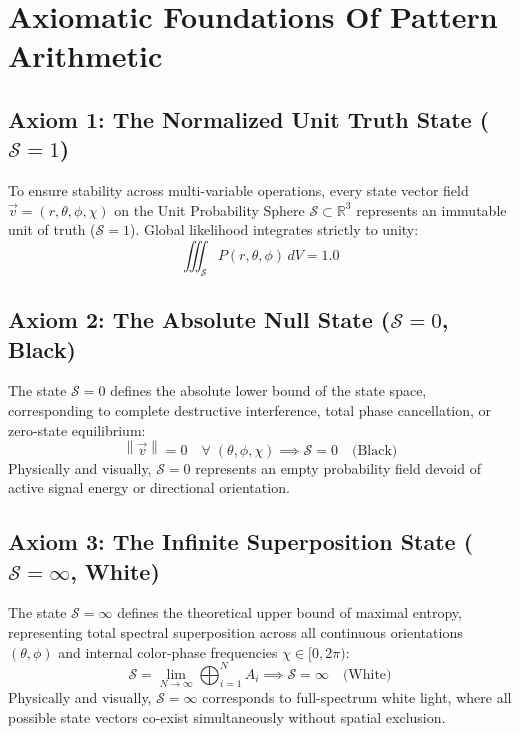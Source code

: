 \documentclass[12pt, a4paper]{article}
\providecommand{\norm}[1]{\left\lVert#1\right\rVert}
\begin{document}
\section{Axiomatic Foundations Of Pattern Arithmetic}

\subsection{Axiom 1: The Normalized Unit Truth State ($\mathcal{S} = 1$)}
\label{subsec:axiom1}
To ensure stability across multi-variable operations, every state vector field $\vec{v} = (r, \theta, \phi, \chi)$ on the Unit Probability Sphere $\mathcal{S} \subset \mathbb{R}^3$ represents an immutable unit of truth ($\mathcal{S} = 1$). Global likelihood integrates strictly to unity:
\begin{equation}
    \iiint_{\mathcal{S}} P(r, \theta, \phi) \, dV = 1.0
    \label{eq:unit_truth}
\end{equation}

\subsection{Axiom 2: The Absolute Null State ($\mathcal{S} = 0$, Black)}
\label{subsec:axiom_null}
The state $\mathcal{S} = 0$ defines the absolute lower bound of the state space, corresponding to complete destructive interference, total phase cancellation, or zero-state equilibrium:
\begin{equation}
    \norm{\vec{v}} = 0 \quad \forall \; (\theta, \phi, \chi) \implies \mathcal{S} = 0 \quad \text{(Black)}
    \label{eq:null_state}
\end{equation}
Physically and visually, $\mathcal{S} = 0$ represents an empty probability field devoid of active signal energy or directional orientation.

\subsection{Axiom 3: The Infinite Superposition State ($\mathcal{S} = \infty$, White)}
\label{subsec:axiom_infinite}
The state $\mathcal{S} = \infty$ defines the theoretical upper bound of maximal entropy, representing total spectral superposition across all continuous orientations $(\theta, \phi)$ and internal color-phase frequencies $\chi \in [0, 2\pi)$:
\begin{equation}
    \mathcal{S} = \lim_{N \to \infty} \bigoplus_{i=1}^{N} A_i \implies \mathcal{S} = \infty \quad \text{(White)}
    \label{eq:infinite_state}
\end{equation}
Physically and visually, $\mathcal{S} = \infty$ corresponds to full-spectrum white light, where all possible state vectors co-exist simultaneously without spatial exclusion.
\end{document}
